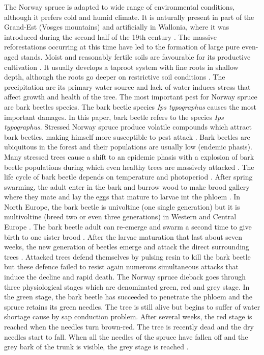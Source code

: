 \documentclass[3p,procedia]{elsarticle}
\begin{document}
The Norway spruce is adapted to wide range of environmental conditions, although it prefers cold and humid climate.
It is naturally present in part of the Grand-Est (Vosges mountains) and artificially in Wallonia, where it was introduced during the second half of the 19th century \citep{Noirfalise_1975}.
The massive reforestations occurring at this time have led to the formation of large pure even-aged stands.
Moist and reasonably fertile soils are favourable for its productive cultivation \citep{horgan_guide_2003}.
It usually develops a taproot system with fine roots in shallow depth, although the roots go deeper on restrictive soil conditions \citep{puhe_roots_2003}.   
The precipitation are its primary water source \citep{tjoelker_outline_2007} and lack of water induces stress that affect growth and health of the tree. 
The most important pest for Norway spruce are bark beetles species.
The bark beetle species \textit{Ips typographus} causes the most important damages.
In this paper, bark beetle refers to the species \textit{Ips typographus}.
Stressed Norway spruce produce volatile compounds which attract bark beetles, making himself more susceptible to pest attack \citep{netherer_waterlimiting_2015,netherer_interactions_2021}.
Bark beetles are ubiquitous in the forest and their populations are usually low (endemic phasis).
Many stressed trees  cause a shift to an epidemic phasis with a explosion of bark beetle populations during which even healthy trees are massively attacked \citep{kautz_individual_2014}.
The life cycle of bark beetle depends on temperature and photoperiod \citep{baier_phenipscomprehensive_2007,annila_influence_1969}.
After spring swarming, the adult enter in the bark and burrow wood to make brood gallery where they mate and lay the eggs that mature to larvae int the phloem \citep{hlasny_bark_2021}.
In North Europe, the bark beetle is univoltine (one single generation) but it is multivoltine (breed two or even three generations) in Western and Central Europe \citep{annila_influence_1969}.
The bark beetle adult can re-emerge and swarm a second time to give birth to one sister brood \citep{zolubas_1995}.
After the larvae maturation that last about seven weeks, the new generation of beetles emerge and attack the direct surrounding trees \citep{zolubas_1995}.
Attacked trees defend themselves by pulsing resin to kill the bark beetle but these defence failed to resist again numerous simultaneous attacks that induce the decline and rapid death.
The Norway spruce dieback goes through three physiological stages which are denominated green, red and grey stage.
In the green stage, the bark beetle has succeeded to penetrate the phloem and the spruce retains its green needles. 
The tree is still alive but begins to suffer of water shortage cause by sap conduction problem. 
After several weeks, the red stage is reached when the needles turn brown-red. The tree is recently dead and the dry needles start to fall.
When all the needles of the spruce have fallen off and the grey bark of the trunk is visible, the grey stage is reached \citep{abdullah_european_2018}. 
\end{document}
